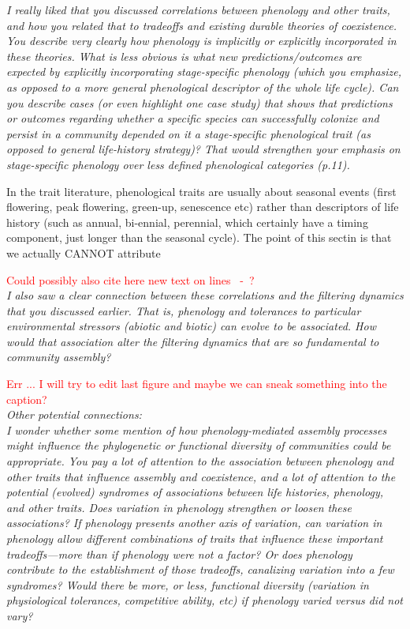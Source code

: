 \documentclass[11pt]{article}
\newcommand{\lr}[1]{~\lineref{#1}}
\begin{document}
\emph{I really liked that you discussed correlations between phenology and other traits, and how you related that to tradeoffs and existing durable theories of coexistence. You describe very clearly how phenology is implicitly or explicitly incorporated in these theories. What is less obvious is what new predictions/outcomes are expected by explicitly incorporating stage-specific phenology (which you emphasize, as opposed to a more general phenological descriptor of the whole life cycle). Can you describe cases (or even highlight one case study) that shows that predictions or outcomes regarding whether a specific species can successfully colonize and persist in a community depended on it a stage-specific phenological trait (as opposed to general life-history strategy)? That would strengthen your emphasis on stage-specific phenology over less defined phenological categories (p.11).}

In the trait literature, phenological traits are usually about seasonal events (first flowering, peak flowering, green-up, senescence etc) rather than descriptors of life history (such as annual, bi-ennial, perennial, which certainly have a timing component, just longer than the seasonal cycle). The point of this sectin is that we actually CANNOT attribute 

\textcolor{red}{Could possibly also cite here new text on lines \lr{definestorage4S}-\lr{definestorage4E}?}\\

\emph{I also saw a clear connection between these correlations and the filtering dynamics that you discussed earlier. That is, phenology and tolerances to particular environmental stressors (abiotic and biotic) can evolve to be associated. How would that association alter the filtering dynamics that are so fundamental to community assembly?}

\textcolor{red}{Err ... I will try to edit last figure and maybe we can sneak something into the caption?}\\


\emph{Other potential connections:\\
I wonder whether some mention of how phenology-mediated assembly processes might influence the phylogenetic or functional diversity of communities could be appropriate. You pay a lot of attention to the association between phenology and other traits that influence assembly and coexistence, and a lot of attention to the potential (evolved) syndromes of associations between life histories, phenology, and other traits. Does variation in phenology strengthen or loosen these associations? If phenology presents another axis of variation, can variation in phenology allow different combinations of traits that influence these important tradeoffs—more than if phenology were not a factor? Or does phenology contribute to the establishment of those tradeoffs, canalizing variation into a few syndromes? Would there be more, or less, functional diversity (variation in physiological tolerances, competitive ability, etc) if phenology varied versus did not vary?}
\end{document}
